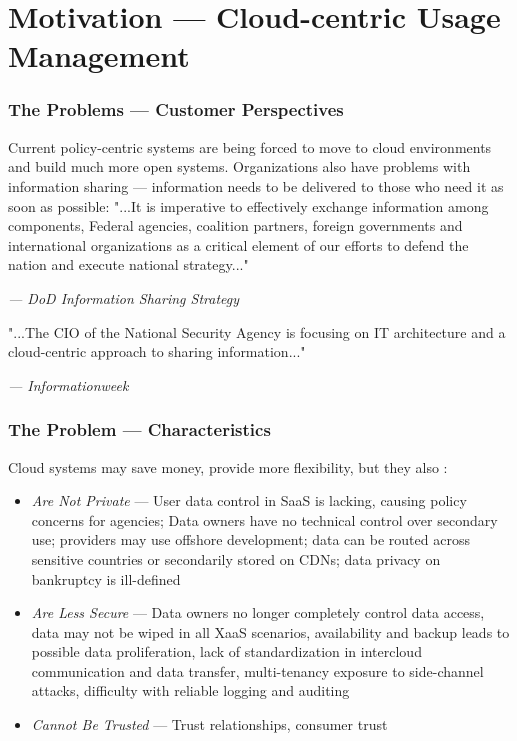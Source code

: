 \section{Motivation --- Cloud-centric Usage Management}


\begin{frame}[t]
\frametitle{The Problems --- Customer Perspectives}
Current policy-centric systems are being forced to move to cloud environments and build much more open systems.  Organizations also have problems with information sharing --- information needs to be delivered to those who need it as soon as possible:
\newline
\newline
"...It is imperative to  effectively exchange information among components, Federal agencies, coalition partners, foreign governments and international organizations as a critical element of our efforts to defend the nation and execute national strategy..."\cite{proposal:info-sharing-strategy}
\newline
\begin{footnotesize}\textit{--- DoD Information Sharing Strategy}\end{footnotesize}
\newline
\newline
"...The CIO of the National Security Agency is focusing on IT architecture and a cloud-centric approach to sharing information..."\cite{proposal:nsa-cloud}
\newline
\begin{footnotesize}\textit{--- Informationweek}\end{footnotesize}
\end{frame}

\begin{frame}[t]
\frametitle{The Problem --- Characteristics}
Cloud systems may save money, provide more flexibility, but they also \cite{proposal:privacy-security-trust-cloud}:
\begin{itemize}
\item<2-> \textit{Are Not Private} --- User data control in SaaS is lacking, causing policy concerns for agencies; Data owners have no technical control over secondary use; providers may use offshore development; data can be routed across sensitive countries or secondarily stored on CDNs; data privacy on bankruptcy is ill-defined
\item<3-> \textit{Are Less Secure} --- Data owners no longer completely control data access, data may not be wiped in all XaaS scenarios, availability and backup leads to possible data proliferation, lack of standardization in intercloud communication and data transfer, multi-tenancy exposure to side-channel attacks, difficulty with reliable logging and auditing
\item<4-> \textit{Cannot Be Trusted} --- Trust relationships, consumer trust
\end{itemize}
\end{frame}

